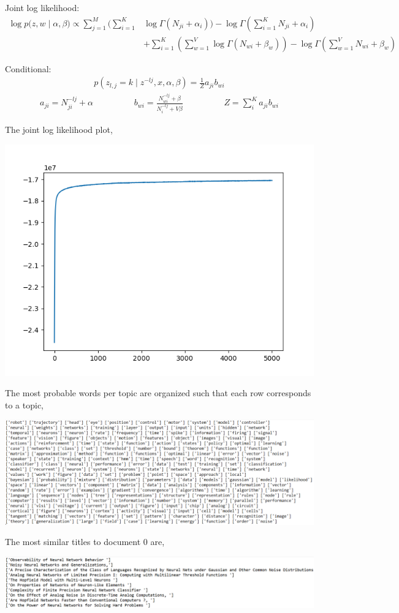 \documentclass[10pt]{homeworg}
\begin{document}
 
Joint log likelihood:
\begin{align*}
\log{p(z,w \mid \alpha, \beta}) \propto \sum_{j=1}^M (\sum_{i=1}^K &\log{\Gamma(N_{ji} + \alpha_i)}) - \log{\Gamma(\sum_{i=1}^K N_{ji} + \alpha_i)}\\
& + \sum_{i=1}^K (\sum_{w=1}^V \log{\Gamma(N_{wi} + \beta_w)}) - \log{\Gamma(\sum_{w=1}^V N_{wi} + \beta_w)}
\end{align*}

Conditional:
\begin{align*}
p(z_{l,j} = k \mid z^{-lj}, x, \alpha, \beta) = \frac{1}{Z} a_{ji} b_{wi}
\end{align*}
\vspace{-0.5cm}
\begin{align*}
a_{ji} = N_{ji}^{-lj} + \alpha   \hspace{2cm}  b_{wi} = \frac{N_{wi}^{-lj} + \beta}{N_i^{-lj} + V\beta}  \hspace{2cm} Z = \sum_i^K a_{ji}b_{wi}
\end{align*}

The joint log likelihood plot,

\begin{center}
\includegraphics[scale=0.5]{figures/jll.png}
\end{center}


The most probable words per topic are organized such that each row corresponds to a topic,

\begin{center}
\includegraphics[scale=0.5]{figures/most_probable_words_per_topic.png}
\end{center}

The most similar titles to document 0 are,

\begin{center}
\includegraphics[scale=0.5]{figures/most_similar_titles_to_0}
\end{center}
\end{document}
